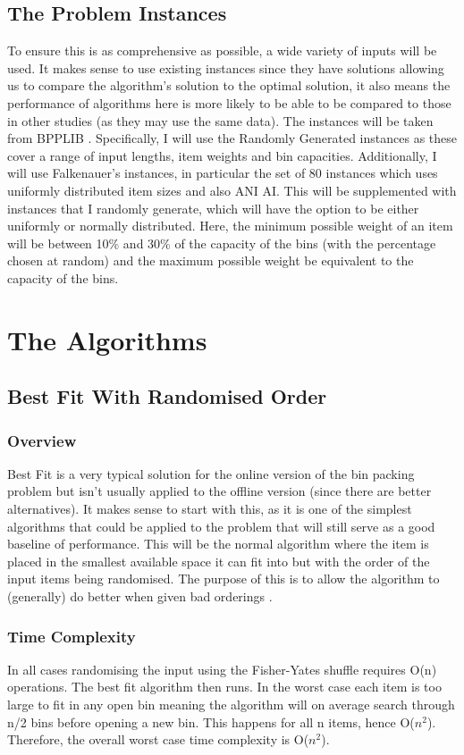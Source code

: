 \documentclass[12pt]{article}
\begin{document}
\subsection{The Problem Instances}
To ensure this is as comprehensive as possible, a wide variety of inputs will be used. It makes sense to use existing instances since they have solutions allowing us to compare the algorithm's solution to the optimal solution, it also means the performance of algorithms here is more likely to be able to be compared to those in other studies (as they may use the same data). The instances will be taken from BPPLIB \cite{BPPLIB}. Specifically, I will use the Randomly Generated instances as these cover a range of input lengths, item weights and bin capacities. Additionally, I will use Falkenauer's instances, in particular the set of 80 instances which uses uniformly distributed item sizes and also ANI AI. This will be supplemented with instances that I randomly generate, which will have the option to be either uniformly or normally distributed. Here, the minimum possible weight of an item will be between 10\% and 30\% of the capacity of the bins (with the percentage chosen at random) and the maximum possible weight be equivalent to the capacity of the bins. 

\section{The Algorithms}

\subsection{Best Fit With Randomised Order}
\subsubsection{Overview}
Best Fit is a very typical solution for the online version of the bin packing problem but isn't usually applied to the offline version (since there are better alternatives). It makes sense to start with this, as it is one of the simplest algorithms that could be applied to the problem that will still serve as a good baseline of performance. This will be the normal algorithm where the item is placed in the smallest available space it can fit into but with the order of the input items being randomised. The purpose of this is to allow the algorithm to (generally) do better when given bad orderings \cite{rajeev}.
\subsubsection{Time Complexity}
In all cases randomising the input using the Fisher-Yates shuffle requires O(n) operations. The best fit algorithm then runs. In the worst case each item is too large to fit in any open bin meaning the algorithm will on average search through n/2 bins before opening a new bin. This happens for all n items, hence O($n^2$). Therefore, the overall worst case time complexity is O($n^2$). 
\end{document}
